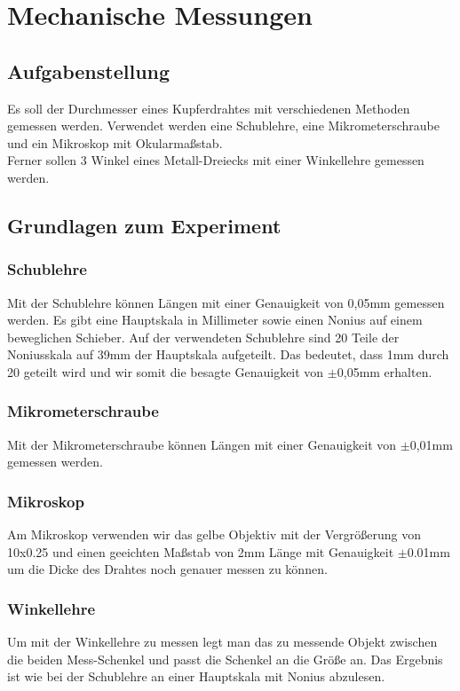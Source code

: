 \documentclass{article}
\begin{document}
\section{Mechanische Messungen}
\subsection{Aufgabenstellung}
Es soll der Durchmesser eines Kupferdrahtes mit verschiedenen Methoden gemessen werden. Verwendet werden eine Schublehre, eine Mikrometerschraube und ein Mikroskop mit Okularmaßstab.\\
Ferner sollen 3 Winkel eines Metall-Dreiecks mit einer Winkellehre gemessen werden.

\subsection{Grundlagen zum Experiment}
\subsubsection*{Schublehre}
Mit der Schublehre können Längen mit einer Genauigkeit von 0,05mm gemessen werden. Es gibt eine Hauptskala in Millimeter sowie einen Nonius auf einem beweglichen Schieber. Auf der verwendeten Schublehre sind 20 Teile der Noniusskala auf 39mm der Hauptskala aufgeteilt. Das bedeutet, dass 1mm durch 20 geteilt wird und wir somit die besagte Genauigkeit von $\pm$0,05mm erhalten.\\
\subsubsection*{Mikrometerschraube}
Mit der Mikrometerschraube können Längen mit einer Genauigkeit von $\pm$0,01mm gemessen werden.

\subsubsection*{Mikroskop}
Am Mikroskop verwenden wir das gelbe Objektiv mit der Vergrößerung von 10x0.25 und einen geeichten Maßstab von 2mm Länge mit Genauigkeit $\pm$0.01mm um die Dicke des Drahtes noch genauer messen zu können. 
\subsubsection*{Winkellehre}
Um mit der Winkellehre zu messen legt man das zu messende Objekt zwischen die beiden Mess-Schenkel und passt die Schenkel an die Größe an. Das Ergebnis ist wie bei der Schublehre an einer Hauptskala mit Nonius abzulesen.
\end{document}
